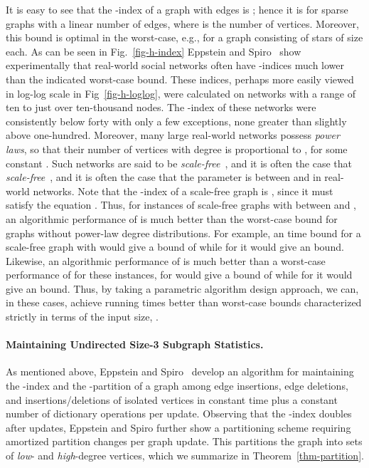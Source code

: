 \documentclass[11pt]{article}
\renewcommand{\subsection}[1]{\paragraph{\textbf{#1}.}}
\begin{document}
It is easy to see that the -index of a graph with  edges 
is ; hence it is  for sparse graphs with a
linear number of edges, where  is the number of vertices.
Moreover,
this bound is optimal in the worst-case, e.g., for a graph consisting
of  stars of size  each.
As can be seen in Fig.~\ref{fig-h-index} Eppstein and Spiro~\cite{es-hgadss-09} 
show experimentally that real-world social networks often have
-indices much lower than the indicated worst-case bound.
These indices, perhaps more easily viewed in log-log scale in Fig~\ref{fig-h-loglog}, were calculated on
networks with a range of ten to just over ten-thousand nodes. The -index of these networks were consistently below forty with only a few exceptions, 
none greater than slightly above one-hundred.
Moreover, many large real-world networks possess
\emph{power laws}, so that their number of vertices 
with degree  is proportional to , for 
some constant .
Such networks are said to be 
\ifFull
\emph{scale-free}~\cite{AlbJeoBar-Nat-99,LilEdlAma-Nat-01,New-SIAM-03,Pri-Sci-65}, and it is often the case that
\else
\emph{scale-free}~\cite{AlbJeoBar-Nat-99,New-SIAM-03,Pri-Sci-65}, and it is often the case that
\fi
the parameter  is between  and  in real-world networks.
Note that the -index of a scale-free graph is
 , since it must satisfy the equation
 .
 Thus, for instances of scale-free graphs with  between 
 and , an algorithmic performance of  is much better than
  the worst-case  bound for graphs without power-law degree 
  distributions. For example, an  time bound for a scale-free
  graph with
   would give a bound of  while for 
  it would give an  bound. 
  Likewise, an algorithmic performance of  is much better
  than a worst-case performance of  for these instances, for
   would give a bound of  while for 
  it would give an  bound. 
Thus, by taking a parametric algorithm design approach, we can,
in these cases, achieve running times
better than worst-case bounds characterized strictly
in terms of the input size, .



\subsection{Maintaining Undirected Size-3 Subgraph Statistics}
As mentioned above,
Eppstein and Spiro~\cite{es-hgadss-09} 
develop an algorithm for maintaining the -index and 
the -partition of a graph among edge insertions, edge deletions,
and insertions/deletions of isolated vertices in constant time plus a constant
number of dictionary operations per update. Observing that the -index 
doubles after  updates, Eppstein and Spiro further show a 
partitioning scheme requiring amortized  partition changes per 
graph update. This partitions the graph into sets of \emph{low}- and
\emph{high}-degree vertices, which we summarize in Theorem~\ref{thm-partition}. 
\end{document}
